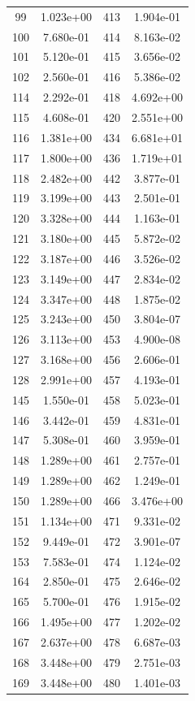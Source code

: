 \documentclass[12pt]{article}
\begin{document}
\begin{longtable}{@{}cccc@{}}
99 & 1.023e+00 & 413 & 1.904e-01 \\
100 & 7.680e-01 & 414 & 8.163e-02 \\
101 & 5.120e-01 & 415 & 3.656e-02 \\
102 & 2.560e-01 & 416 & 5.386e-02 \\
114 & 2.292e-01 & 418 & 4.692e+00 \\
115 & 4.608e-01 & 420 & 2.551e+00 \\
116 & 1.381e+00 & 434 & 6.681e+01 \\
117 & 1.800e+00 & 436 & 1.719e+01 \\
118 & 2.482e+00 & 442 & 3.877e-01 \\
119 & 3.199e+00 & 443 & 2.501e-01 \\
120 & 3.328e+00 & 444 & 1.163e-01 \\
121 & 3.180e+00 & 445 & 5.872e-02 \\
122 & 3.187e+00 & 446 & 3.526e-02 \\
123 & 3.149e+00 & 447 & 2.834e-02 \\
124 & 3.347e+00 & 448 & 1.875e-02 \\
125 & 3.243e+00 & 450 & 3.804e-07 \\
126 & 3.113e+00 & 453 & 4.900e-08 \\
127 & 3.168e+00 & 456 & 2.606e-01 \\
128 & 2.991e+00 & 457 & 4.193e-01 \\
145 & 1.550e-01 & 458 & 5.023e-01 \\
146 & 3.442e-01 & 459 & 4.831e-01 \\
147 & 5.308e-01 & 460 & 3.959e-01 \\
148 & 1.289e+00 & 461 & 2.757e-01 \\
149 & 1.289e+00 & 462 & 1.249e-01 \\
150 & 1.289e+00 & 466 & 3.476e+00 \\
151 & 1.134e+00 & 471 & 9.331e-02 \\
152 & 9.449e-01 & 472 & 3.901e-07 \\
153 & 7.583e-01 & 474 & 1.124e-02 \\
164 & 2.850e-01 & 475 & 2.646e-02 \\
165 & 5.700e-01 & 476 & 1.915e-02 \\
166 & 1.495e+00 & 477 & 1.202e-02 \\
167 & 2.637e+00 & 478 & 6.687e-03 \\
168 & 3.448e+00 & 479 & 2.751e-03 \\
169 & 3.448e+00 & 480 & 1.401e-03 \\

\end{longtable}
\end{document}
